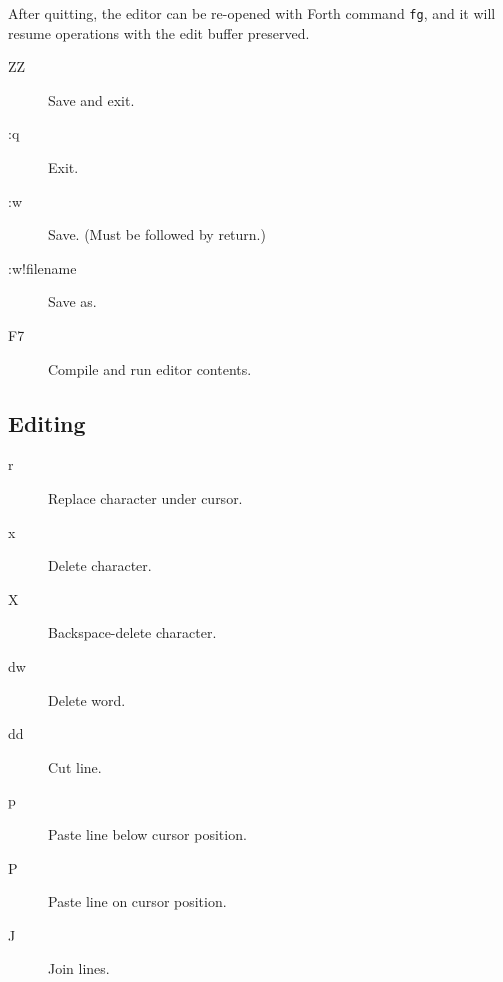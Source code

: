 After quitting, the editor can be re-opened with Forth command \texttt{fg}, and it will resume operations with the edit buffer preserved.

\begin{description}
\item[ZZ] Save and exit.
\item[:q] Exit.
\item[:w] Save. (Must be followed by return.)
\item[:w!filename] Save as.
\item[F7] Compile and run editor contents.
\end{description}

\subsection{Editing}
\begin{description}
\item[r] Replace character under cursor.
\item[x] Delete character.
\item[X] Backspace-delete character.
\item[dw] Delete word.
\item[dd] Cut line.
\item[p] Paste line below cursor position.
\item[P] Paste line on cursor position.
\item[J] Join lines.
\end{description}
